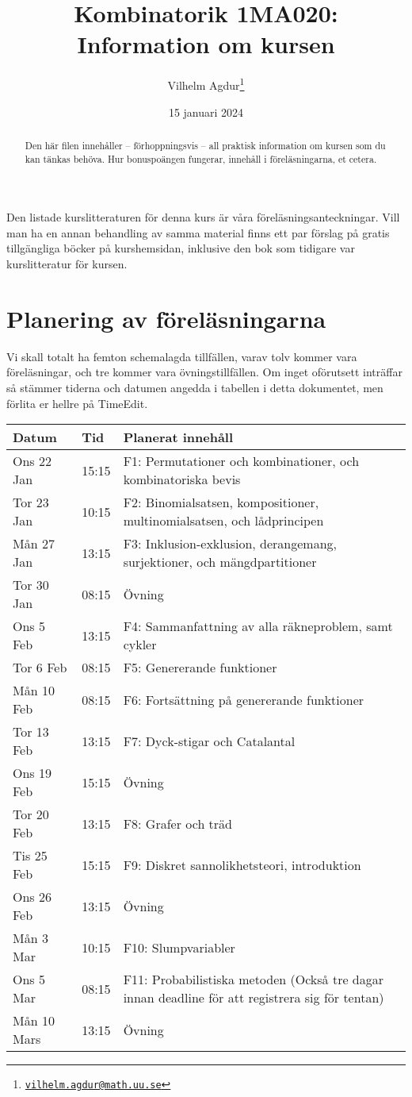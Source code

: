 \documentclass[nobib]{tufte-handout}
\title{Kombinatorik 1MA020: Information om kursen}
\author[Vilhelm Agdur]{Vilhelm Agdur\thanks{\href{mailto:vilhelm.agdur@math.uu.se}{\nolinkurl{vilhelm.agdur@math.uu.se}}}}
\date{15 januari 2024}
\begin{document}
\maketitle%

\begin{abstract}
\noindent
Den här filen innehåller -- förhoppningsvis -- all praktisk information om kursen som du kan tänkas behöva. Hur bonuspoängen fungerar, innehåll
i föreläsningarna, et cetera. 
\end{abstract}

Den listade kurslitteraturen för denna kurs är våra föreläsningsanteckningar. Vill man ha en annan behandling av samma material finns ett par förslag på gratis tillgängliga böcker på kurshemsidan, inklusive den bok som tidigare var kurslitteratur för kursen.

\section{Planering av föreläsningarna}

Vi skall totalt ha femton schemalagda tillfällen, varav tolv kommer vara föreläsningar, och tre kommer vara övningstillfällen. Om inget oförutsett inträffar så stämmer tiderna och datumen angedda i tabellen i detta dokumentet, men förlita er hellre på TimeEdit.

\begin{table}[h]
\begin{tabularx}{\textwidth}{llX}
Datum & Tid      & Planerat innehåll \\ 
\midrule
Ons 22 Jan &15:15 & F1: Permutationer och kombinationer, och kombinatoriska bevis\\
Tor 23 Jan &10:15 & F2: Binomialsatsen, kompositioner, multinomialsatsen, och lådprincipen\\
Mån 27 Jan &13:15 & F3: Inklusion-exklusion, derangemang, surjektioner, och mängdpartitioner\\
Tor 30 Jan &08:15 & Övning\\
Ons 5 Feb &13:15 & F4: Sammanfattning av alla räkneproblem, samt cykler\\
Tor 6 Feb &08:15 & F5: Genererande funktioner\\
Mån 10 Feb &08:15 & F6: Fortsättning på genererande funktioner\\
Tor 13 Feb &13:15 & F7: Dyck-stigar och Catalantal\\
Ons 19 Feb &15:15 & Övning\\
Tor 20 Feb &13:15 & F8: Grafer och träd\\
Tis 25 Feb &15:15 & F9: Diskret sannolikhetsteori, introduktion\\
Ons 26 Feb &13:15 & Övning\\
Mån 3 Mar &10:15 & F10: Slumpvariabler\\
Ons 5 Mar &08:15 & F11: Probabilistiska metoden (Också tre dagar innan deadline för att registrera sig för tentan)\\
Mån 10 Mars &13:15 & Övning
\end{tabularx}
\end{table}
\end{document}

